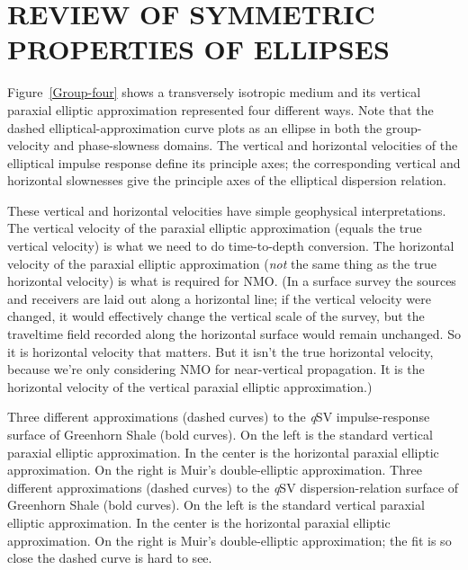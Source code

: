 \section{REVIEW OF SYMMETRIC PROPERTIES OF ELLIPSES}
Figure~\ref{Group-four} shows a transversely isotropic medium
and its vertical paraxial elliptic approximation represented
four different ways. Note that the dashed elliptical-approximation curve
plots as an ellipse in both the group-velocity and phase-slowness domains.
The vertical and horizontal velocities of the elliptical impulse response
define its principle axes; the corresponding vertical and horizontal
slownesses give the principle axes of the elliptical dispersion relation.


These vertical and horizontal velocities have simple geophysical
interpretations. The vertical velocity
of the paraxial elliptic approximation
(equals the true vertical velocity)
is what we need to do time-to-depth
conversion.
The horizontal velocity
of the paraxial elliptic approximation
({\em not\/} the same thing as the true horizontal velocity)
is what is required for NMO.
(In a surface survey the sources and receivers are laid out along a
horizontal line; if the vertical velocity were changed,
it would effectively change the vertical scale of the survey, but
the traveltime field recorded along the horizontal surface would
remain unchanged.
So it is horizontal velocity that matters. But it isn't the true
horizontal velocity, because we're only considering NMO for near-vertical
propagation. It is the horizontal velocity of the vertical paraxial
elliptic approximation.)

{
Three different approximations (dashed curves) to the
{\sl q}SV impulse-response surface of Greenhorn Shale (bold curves).
On the left is the standard vertical paraxial elliptic approximation. In the
center is the horizontal paraxial elliptic approximation.
On the right is Muir's double-elliptic approximation.
}
{
Three different approximations (dashed curves) to the
{\sl q}SV dispersion-relation surface of Greenhorn Shale (bold curves).
On the left is the standard vertical paraxial elliptic approximation. In the
center is the horizontal paraxial elliptic approximation.
On the right is Muir's double-elliptic approximation;
the fit is so close the dashed curve is hard to see.
}

